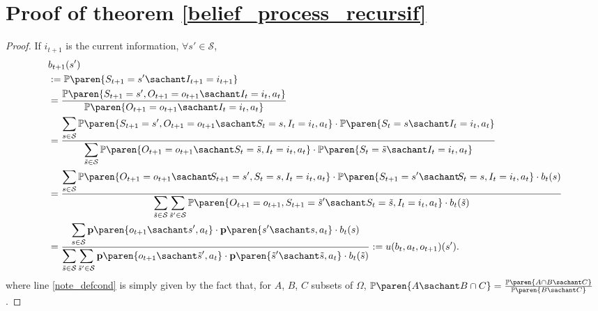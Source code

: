 \section{Proof of theorem \ref{belief_process_recursif}}
\begin{proof}
If $i_{t+1}$ is the current information, $\forall s' \in \mathcal{S}$,
\begin{align}
\nonumber & b_{t+1}(s') \\
\nonumber	 		&:= \mathbb{P} \paren{ S_{t+1} = s' \sachant I_{t+1} = i_{t+1}} \\
\label{note_defcond}		&= \frac{ \mathbb{P} \paren{ S_{t+1} = s', O_{t+1}=o_{t+1} \sachant I_t=i_t,a_{t} }}{ 
\mathbb{P} \paren{ O_{t+1} = o_{t+1} \sachant I_t=i_t,a_{t}  } } \\
\nonumber		&= \frac{ \displaystyle \sum_{s \in \mathcal{S}} \mathbb{P} \paren{ S_{t+1} = s', O_{t+1}=o_{t+1} \sachant S_{t}=s,I_t=i_t,a_{t} } \cdot \mathbb{P} \paren{ S_t = s \sachant I_t=i_t,a_{t} }}{ 
\displaystyle \sum_{\tilde{s} \in \mathcal{S}} \mathbb{P} \paren{ O_{t+1} = o_{t+1} \sachant S_t = \tilde{s}, I_t=i_t,a_{t}  } \cdot \mathbb{P} \paren{ S_t = \tilde{s} \sachant I_t=i_t,a_{t} } } \\
\nonumber		&= \frac{ \displaystyle \sum_{s \in \mathcal{S}}  \mathbb{P} \paren{ O_{t+1} = o_{t+1} \sachant \hspace{-0.08cm} S_{t+1}=s', S_{t}=s,I_t=i_t,a_{t} } \cdot \mathbb{P} \paren{ S_{t+1} = s' \sachant \hspace{-0.08cm} S_{t}=s,I_t=i_t,a_{t} } \cdot b_t(s) }{ 
\displaystyle \sum_{\tilde{s} \in \mathcal{S}} \sum_{\tilde{s}' \in \mathcal{S}}  \mathbb{P} \paren{ O_{t+1} = o_{t+1}, S_{t+1}=\tilde{s}' \sachant S_t=\tilde{s}, I_t=i_t,a_{t}  } \cdot b_t(\tilde{s})  } \\
\nonumber	&= \frac{ \displaystyle \sum_{s \in \mathcal{S}}  \textbf{p} \paren{ o_{t+1} \sachant s', a_{t} } \cdot \textbf{p} \paren{ s' \sachant s,a_t } \cdot b_t(s) }{ 
\displaystyle \sum_{\tilde{s} \in \mathcal{S}} \sum_{\tilde{s}' \in \mathcal{S}} \textbf{p} \paren{ o_{t+1} \sachant \tilde{s}', a_{t} } \cdot \textbf{p} \paren{ \tilde{s}' \sachant \tilde{s},a_t } \cdot b_t(\tilde{s})  } := u(b_t,a_{t},o_{t+1})(s').
\end{align}
where line \ref{note_defcond} is simply given by the fact that, for $A$, $B$, $C$ subsets of $\Omega$, 
$\mathbb{P} \paren{ A \sachant B \cap C } = \frac{\mathbb{P} \paren{ A \cap B \sachant C }}{\mathbb{P} \paren{  B \sachant C }}$.
\end{proof}








